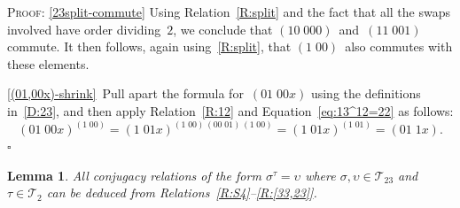 \documentclass[a4paper,11pt]{article}
\numberwithin{equation}{section}
\newcommand{\swap}[2]{(#1\;#2)}
\newcommand{\Sw}[1]{\mathcal{T}_{#1}}
\newcommand{\qed}{\hspace*{\fill}$\square$}
\newtheorem{lemma}[thm]{Lemma}
\newenvironment{proof}{%
  \begin{trivlist}\item\textsc{Proof:}}{\qed\end{trivlist}}
\begin{document}
\begin{proof}
  \ref{23split-commute} Using Relation~\ref{R:split} and the fact
  that all the swaps involved have order dividing~$2$, we conclude
  that $\swap{10}{000}$~and~$\swap{11}{001}$ commute.  It then
  follows, again using~\ref{R:split}, that $\swap{1}{00}$~also
  commutes with these elements.

  \ref{(01,00x)-shrink}~Pull apart the formula for~$\swap{01}{00x}$
  using the definitions in~\eqref{D:23}, and then apply
  Relation~\ref{R:12} and Equation~\eqref{eq:13^12=22} as follows:
  \[
  \swap{01}{00x}^{\swap{1}{00}} =
  \swap{1}{01x}^{\swap{1}{00} \, \swap{00}{01} \, \swap{1}{00}} =
  \swap{1}{01x}^{\swap{1}{01}} = \swap{01}{1x}.
  \]
\end{proof}

\begin{lemma}
  \label{lem:23^2}
  All conjugacy relations of the form $\sigma^{\tau} = \upsilon$ where
  $\sigma,\upsilon \in \Sw{23}$ and $\tau \in \Sw{2}$ can be deduced
  from Relations~\ref{R:S4}--\ref{R:[33,23]}.
\end{lemma}
\end{document}
